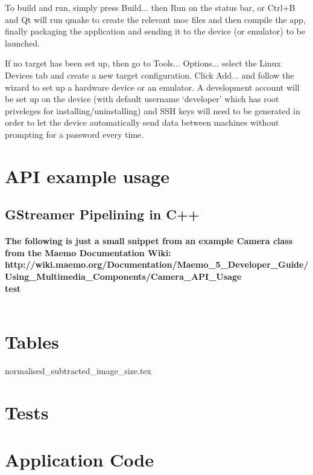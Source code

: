 To build and run, simply press Build... then Run on the status bar, or Ctrl+B and Qt will run qmake to create the relevant moc files and then compile the app, finally packaging the application and sending it to the device (or emulator) to be launched.

If no target has been set up, then go to Tools... Options... select the Linux Devices tab and create a new target configuration. Click Add... and follow the wizard to set up a hardware device or an emulator. A development account will be set up on the device (with default username ‘developer’ which has root priveleges for installing/uninstalling) and SSH keys will need to be generated in order to let the device automatically send data between machines without prompting for a password every time.

\section{API example usage}
\subsection{GStreamer Pipelining in C++}
\paragraph{ The following is just a small snippet from an example Camera class from the Maemo Documentation Wiki:\\http://wiki.maemo.org/Documentation/Maemo\_5\_Developer\_Guide/Using\_Multimedia\_Components/Camera\_API\_Usage
\\ test\\\\}


\section{Tables}
{normalised_subtracted_image_size.tex}

\section{Tests}\label{append:tests}


\section{Application Code}
